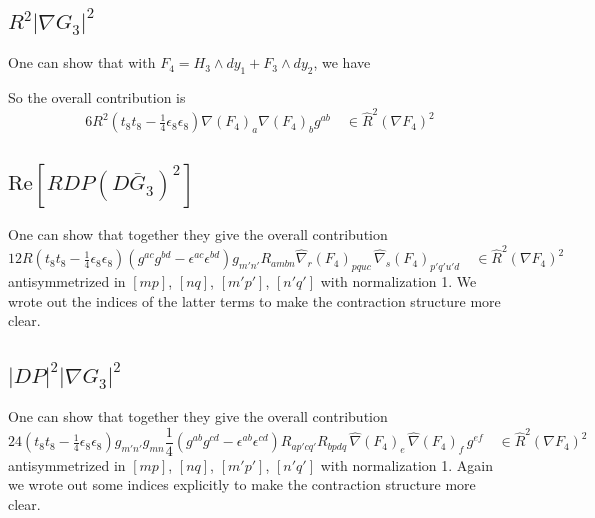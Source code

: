 \subsection{$R^2|\nabla G_3|^2$}
One can show that with $F_4 = H_3 \wedge dy_1 + F_3 \wedge dy_2$, we have

So the overall contribution is
\begin{equation}
6 R^2(t_8t_8 - \tfrac14 \epsilon_8\epsilon_8)  \nabla (F_4)_a \nabla (F_4)_b g^{ab}
\quad \in \hat{R}^2 (\nabla F_4)^2
\end{equation}

\subsection{$\text{Re}[R DP (D\bar{G}_3)^2]$}
One can show that together they give the overall contribution
\begin{equation}
12R(t_8t_8-\tfrac14 \epsilon_8 \epsilon_8)(g^{ac}g^{bd} - \epsilon^{ac}\epsilon^{bd})g_{m' n'}R_{ambn}\hat{\nabla}_r(F_4)_{pquc}\,\hat{\nabla}_s(F_4)_{p'q'u'd}
\quad \in \hat{R}^2 (\nabla F_4)^2
\end{equation}
antisymmetrized in $[mp]$, $[nq]$, $[m'p']$, $[n'q']$ with normalization 1.
We wrote out the indices of the latter terms to make the contraction structure more clear.

\subsection{$|DP|^2|\nabla G_3|^2$}
One can show that together they give the overall contribution
\begin{equation}
24(t_8t_8 - \tfrac14 \epsilon_8 \epsilon_8) g_{m'n'}g_{mn} \frac{1}{4}(g^{ab}g^{cd} - \epsilon^{ab}\epsilon^{cd})R_{a p' c q'}R_{b p d q}
\,\hat{\nabla}(F_4)_e \,\hat{\nabla}(F_4)_f\, g^{ef}
\quad \in \hat{R}^2 (\nabla F_4)^2
\end{equation}
antisymmetrized in $[mp]$, $[nq]$, $[m'p']$, $[n'q']$ with normalization 1.
Again we wrote out some indices explicitly to make the contraction structure more clear.

